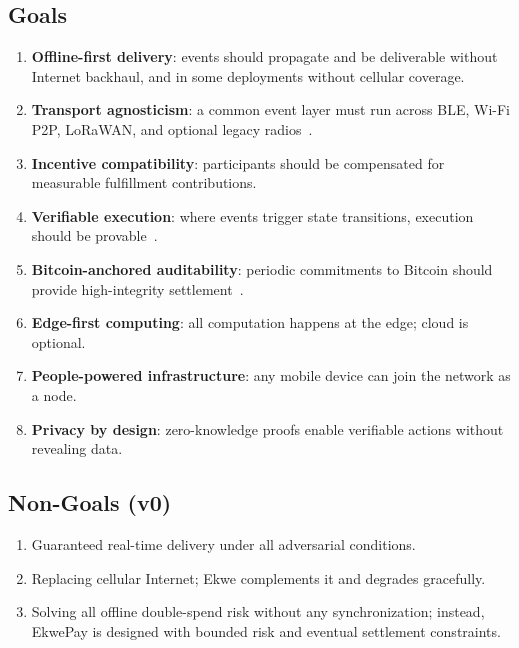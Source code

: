 \documentclass[11pt,a4paper]{article}
\begin{document}
\subsection{Goals}
\begin{enumerate}[label=\textbf{G\arabic*},nosep]
  \item \textbf{Offline-first delivery}: events should propagate and be deliverable without Internet backhaul, and in some deployments without cellular coverage.
  \item \textbf{Transport agnosticism}: a common event layer must run across BLE, Wi-Fi P2P, LoRaWAN, and optional legacy radios~\cite{bt_mesh}.
  \item \textbf{Incentive compatibility}: participants should be compensated for measurable fulfillment contributions.
  \item \textbf{Verifiable execution}: where events trigger state transitions, execution should be provable~\cite{risczero}.
  \item \textbf{Bitcoin-anchored auditability}: periodic commitments to Bitcoin should provide high-integrity settlement~\cite{sok_btc_l2}.
  \item \textbf{Edge-first computing}: all computation happens at the edge; cloud is optional.
  \item \textbf{People-powered infrastructure}: any mobile device can join the network as a node.
  \item \textbf{Privacy by design}: zero-knowledge proofs enable verifiable actions without revealing data.
\end{enumerate}

\subsection{Non-Goals (v0)}
\begin{enumerate}[label=\textbf{N\arabic*},nosep]
  \item Guaranteed real-time delivery under all adversarial conditions.
  \item Replacing cellular Internet; Ekwe complements it and degrades gracefully.
  \item Solving all offline double-spend risk without any synchronization; instead, EkwePay is designed with bounded risk and eventual settlement constraints.
\end{enumerate}

\end{document}
